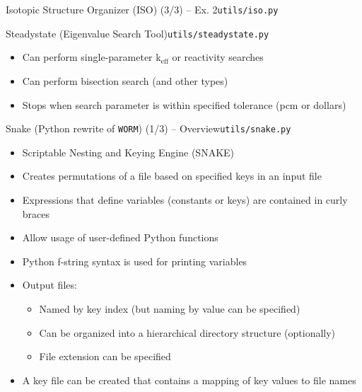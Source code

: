 \documentclass[aspectratio=169]{beamer}
\begin{document}
\begin{frame}{Isotopic Structure Organizer (ISO) (3/3) -- Ex. 2}{\lstinline{utils/iso.py}}
  \begin{example}
    
  \end{example}
\end{frame}

\begin{frame}{Steadystate (Eigenvalue Search Tool)}{\lstinline{utils/steadystate.py}}\label{steadystate}
  \begin{itemize}
    \item{Can perform single-parameter k$_{\mathrm{eff}}$ or reactivity searches}
    \item{Can perform bisection search (and other types)}
    \item{Stops when search parameter is within specified tolerance (pcm or dollars)}
  \end{itemize}
  \begin{example}
    
  \end{example}
  \begin{example}
    
  \end{example}
\end{frame}

\begin{frame}{Snake (Python rewrite of \lstinline{WORM}) (1/3) -- Overview}{\lstinline{utils/snake.py}}\label{snake}
  \begin{itemize}
    \item{Scriptable Nesting and Keying Engine (SNAKE)}
    \item{Creates permutations of a file based on specified keys in an input file}
    \item{Expressions that define variables (constants or keys) are contained in curly braces}
    \item{Allow usage of user-defined Python functions}
    \item{Python f-string syntax is used for printing variables}
    \item{
      Output files:
      \begin{itemize}
        \item{Named by key index (but naming by value can be specified)}
        \item{Can be organized into a hierarchical directory structure (optionally)}
        \item{File extension can be specified}
      \end{itemize}
    }

    \item{A key file can be created that contains a mapping of key values to file names}
  \end{itemize}
\end{frame}
\end{document}
